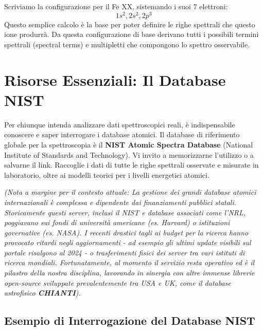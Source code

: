 Scriviamo la configurazione per il Fe XX, sistemando i suoi 7 elettroni:
\begin{equation}
1s^2 , 2s^2 , 2p^3
\end{equation}
Questo semplice calcolo è la base per poter definire le righe spettrali che questo ione produrrà. Da questa configurazione di base derivano tutti i possibili termini spettrali (spectral terms) e multipletti che compongono lo spettro osservabile.

\section{Risorse Essenziali: Il Database NIST}

Per chiunque intenda analizzare dati spettroscopici reali, è indispensabile conoscere e saper interrogare i database atomici.
Il database di riferimento globale per la spettroscopia è il \textbf{NIST Atomic Spectra Database} (National Institute of Standards and Technology).
Vi invito a memorizzarne l'utilizzo o a salvarne il link. Raccoglie i dati di tutte le righe spettrali osservate e misurate in laboratorio, oltre ai modelli teorici per i livelli energetici atomici.

\textit{(Nota a margine per il contesto attuale: La gestione dei grandi database atomici internazionali è complessa e dipendente dai finanziamenti pubblici statali. Storicamente questi server, inclusi il NIST e database associati come l'NRL, poggiavano sui fondi di università americane (es. Harvard) o istituzioni governative (es. NASA). I recenti drastici tagli ai budget per la ricerca hanno provocato ritardi negli aggiornamenti - ad esempio gli ultimi update visibili sul portale risalgono al 2024 - o trasferimenti fisici dei server tra vari istituti di ricerca mondiali. Fortunatamente, al momento il servizio resta operativo ed è il pilastro della nostra disciplina, lavorando in sinergia con altre immense librerie open-source sviluppate prevalentemente tra USA e UK, come il database astrofisico \textbf{CHIANTI}).}

\subsection{Esempio di Interrogazione del Database NIST}

